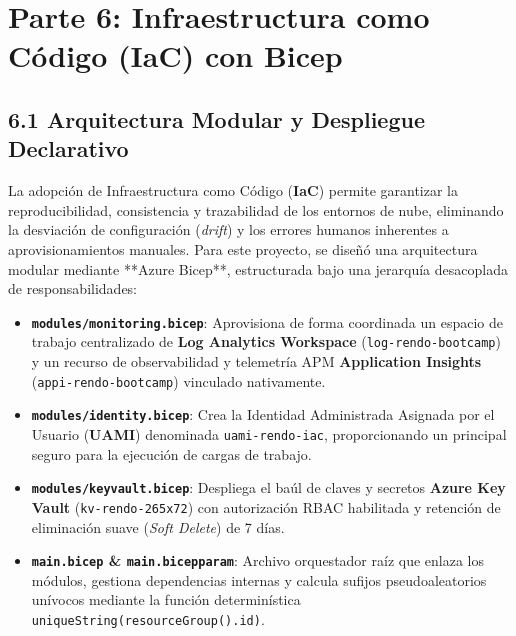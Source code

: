 \section{Parte 6: Infraestructura como Código (IaC) con Bicep}

\subsection{6.1 Arquitectura Modular y Despliegue Declarativo}
La adopción de Infraestructura como Código (\textbf{IaC}) permite garantizar la reproducibilidad, consistencia y trazabilidad de los entornos de nube, eliminando la desviación de configuración (\textit{drift}) y los errores humanos inherentes a aprovisionamientos manuales. Para este proyecto, se diseñó una arquitectura modular mediante **Azure Bicep**, estructurada bajo una jerarquía desacoplada de responsabilidades:

\begin{itemize}
    \item \textbf{\texttt{modules/monitoring.bicep}}: Aprovisiona de forma coordinada un espacio de trabajo centralizado de \textbf{Log Analytics Workspace} (\texttt{log-rendo-bootcamp}) y un recurso de observabilidad y telemetría APM \textbf{Application Insights} (\texttt{appi-rendo-bootcamp}) vinculado nativamente.
    \item \textbf{\texttt{modules/identity.bicep}}: Crea la Identidad Administrada Asignada por el Usuario (\textbf{UAMI}) denominada \texttt{uami-rendo-iac}, proporcionando un principal seguro para la ejecución de cargas de trabajo.
    \item \textbf{\texttt{modules/keyvault.bicep}}: Despliega el baúl de claves y secretos \textbf{Azure Key Vault} (\texttt{kv-rendo-265x72}) con autorización RBAC habilitada y retención de eliminación suave (\textit{Soft Delete}) de 7 días.
    \item \textbf{\texttt{main.bicep} \& \texttt{main.bicepparam}}: Archivo orquestador raíz que enlaza los módulos, gestiona dependencias internas y calcula sufijos pseudoaleatorios unívocos mediante la función determinística \texttt{uniqueString(resourceGroup().id)}.
\end{itemize}


